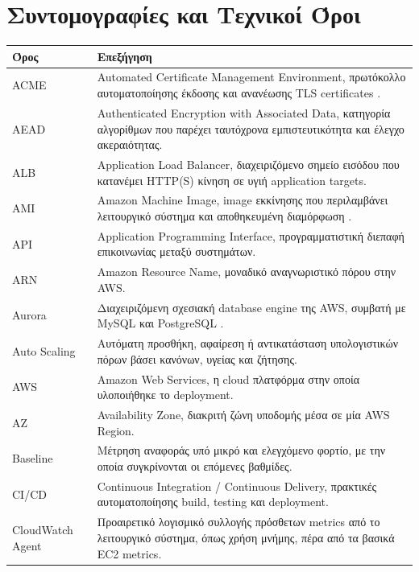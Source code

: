 \documentclass[12pt,a4paper,twoside,fleqn]{book}
\begin{document}
\clearpage
\tableofcontents
\clearpage
\listoffigures
{}
\clearpage
\listoftables
{}
\clearpage

\chapter*{Συντομογραφίες και Τεχνικοί Όροι}
\begin{longtable}{@{}p{3.8cm}p{9.2cm}@{}}
\textbf{Όρος} & \textbf{Επεξήγηση}\\
\midrule
ACME & Automated Certificate Management Environment, πρωτόκολλο αυτοματοποίησης έκδοσης και ανανέωσης TLS certificates \cite{rfc8555}.\\
AEAD & Authenticated Encryption with Associated Data, κατηγορία αλγορίθμων που παρέχει ταυτόχρονα εμπιστευτικότητα και έλεγχο ακεραιότητας.\\
ALB & Application Load Balancer, διαχειριζόμενο σημείο εισόδου που κατανέμει HTTP(S) κίνηση σε υγιή application targets.\\
AMI & Amazon Machine Image, image εκκίνησης που περιλαμβάνει λειτουργικό σύστημα και αποθηκευμένη διαμόρφωση \cite{aws2026ami}.\\
API & Application Programming Interface, προγραμματιστική διεπαφή επικοινωνίας μεταξύ συστημάτων.\\
ARN & Amazon Resource Name, μοναδικό αναγνωριστικό πόρου στην AWS.\\
Aurora & Διαχειριζόμενη σχεσιακή database engine της AWS, συμβατή με MySQL και PostgreSQL \cite{aws2026rds}.\\
Auto Scaling & Αυτόματη προσθήκη, αφαίρεση ή αντικατάσταση υπολογιστικών πόρων βάσει κανόνων, υγείας και ζήτησης.\\
AWS & Amazon Web Services, η cloud πλατφόρμα στην οποία υλοποιήθηκε το deployment.\\
AZ & Availability Zone, διακριτή ζώνη υποδομής μέσα σε μία AWS Region.\\
Baseline & Μέτρηση αναφοράς υπό μικρό και ελεγχόμενο φορτίο, με την οποία συγκρίνονται οι επόμενες βαθμίδες.\\
CI/CD & Continuous Integration / Continuous Delivery, πρακτικές αυτοματοποίησης build, testing και deployment.\\
CloudWatch Agent & Προαιρετικό λογισμικό συλλογής πρόσθετων metrics από το λειτουργικό σύστημα, όπως χρήση μνήμης, πέρα από τα βασικά EC2 metrics.\\

\end{longtable}
\end{document}
